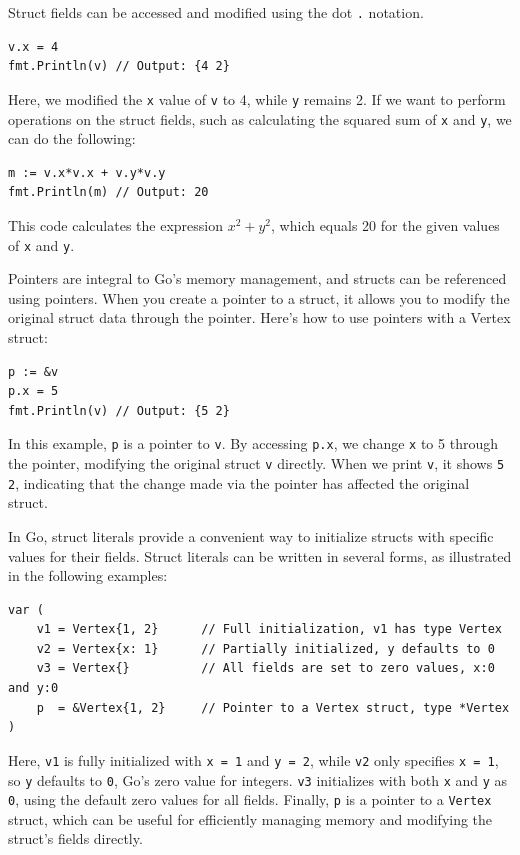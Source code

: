 Struct fields can be accessed and modified using the dot \texttt{.} notation.

\begin{verbatim}
v.x = 4
fmt.Println(v) // Output: {4 2}
\end{verbatim}
Here, we modified the \texttt{x} value of \texttt{v} to 4, while \texttt{y} remains 2. If we want to perform operations on the struct fields, such as calculating the squared sum of \texttt{x} and \texttt{y}, we can do the following:

\begin{verbatim}
m := v.x*v.x + v.y*v.y
fmt.Println(m) // Output: 20
\end{verbatim}
This code calculates the expression $x^2+y^2$, which equals 20 for the given values of \texttt{x} and \texttt{y}.

Pointers are integral to Go's memory management, and structs can be referenced using pointers. When you create a pointer to a struct, it allows you to modify the original struct data through the pointer. Here’s how to use pointers with a Vertex struct:

\begin{verbatim}
p := &v
p.x = 5
fmt.Println(v) // Output: {5 2}
\end{verbatim}
In this example, \texttt{p} is a pointer to \texttt{v}. By accessing \texttt{p.x}, we change \texttt{x} to 5 through the pointer, modifying the original struct \texttt{v} directly. When we print \texttt{v}, it shows \texttt{{5 2}}, indicating that the change made via the pointer has affected the original struct.

In Go, struct literals provide a convenient way to initialize structs with specific values for their fields. Struct literals can be written in several forms, as illustrated in the following examples:

\begin{verbatim}
var (
    v1 = Vertex{1, 2}      // Full initialization, v1 has type Vertex
    v2 = Vertex{x: 1}      // Partially initialized, y defaults to 0
    v3 = Vertex{}          // All fields are set to zero values, x:0 and y:0
    p  = &Vertex{1, 2}     // Pointer to a Vertex struct, type *Vertex
)
\end{verbatim}
Here, \texttt{v1} is fully initialized with \texttt{x = 1} and \texttt{y = 2}, while \texttt{v2} only specifies \texttt{x = 1}, so \texttt{y} defaults to \texttt{0}, Go's zero value for integers. \texttt{v3} initializes with both \texttt{x} and \texttt{y} as \texttt{0}, using the default zero values for all fields. Finally, \texttt{p} is a pointer to a \texttt{Vertex} struct, which can be useful for efficiently managing memory and modifying the struct’s fields directly.

